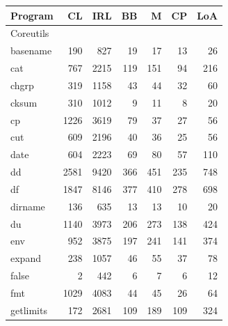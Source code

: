 \begin{longtable}{lrrrrrr}
    \toprule 
    Program         & CL         & IRL & BB & M & CP & LoA  \\
    \midrule 
    \multicolumn{7}{l}{Coreutils} \\
    \midrule 
    basename        & 190        & 827      & 19              & 17              & 13             & 26       \\
    cat             & 767        & 2215     & 119             & 151             & 94             & 216      \\
    chgrp           & 319        & 1158     & 43              & 44              & 32             & 60       \\
    cksum           & 310        & 1012     & 9               & 11              & 8              & 20       \\
    cp              & 1226       & 3619     & 79              & 37              & 27             & 56       \\
    cut             & 609        & 2196     & 40              & 36              & 25             & 56       \\
    date            & 604        & 2223     & 69              & 80              & 57             & 110      \\
    dd              & 2581       & 9420     & 366             & 451             & 235            & 748      \\
    df              & 1847       & 8146     & 377             & 410             & 278            & 698      \\
    dirname         & 136        & 635      & 13              & 13              & 10             & 20       \\
    du              & 1140       & 3973     & 206             & 273             & 138            & 424      \\
    env             & 952        & 3875     & 197             & 241             & 141            & 374      \\
    expand          & 238        & 1057     & 46              & 55              & 37             & 78       \\
    false           & 2          & 442      & 6               & 7               & 6              & 12       \\
    fmt             & 1029       & 4083     & 44              & 45              & 26             & 64       \\
    getlimits       & 172        & 2681     & 109             & 189             & 109            & 324      \\

\end{longtable}
